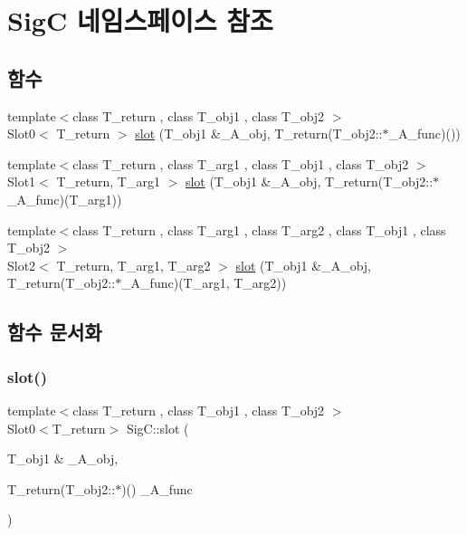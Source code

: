 \hypertarget{namespace_sig_c}{}\section{SigC 네임스페이스 참조}
\label{namespace_sig_c}
\subsection*{함수}
\begin{DoxyCompactItemize}
\item 
{\footnotesize template$<$class T\+\_\+return , class T\+\_\+obj1 , class T\+\_\+obj2 $>$ }\\Slot0$<$ T\+\_\+return $>$ \mbox{\hyperlink{namespace_sig_c_a92e4f19202b77e78ac1db05f5a62f6b6}{slot}} (T\+\_\+obj1 \&\+\_\+\+A\+\_\+obj, T\+\_\+return(T\+\_\+obj2\+::$\ast$\+\_\+\+A\+\_\+func)())
\item 
{\footnotesize template$<$class T\+\_\+return , class T\+\_\+arg1 , class T\+\_\+obj1 , class T\+\_\+obj2 $>$ }\\Slot1$<$ T\+\_\+return, T\+\_\+arg1 $>$ \mbox{\hyperlink{namespace_sig_c_a593d0d3f9fec3996bcdb781f14bff628}{slot}} (T\+\_\+obj1 \&\+\_\+\+A\+\_\+obj, T\+\_\+return(T\+\_\+obj2\+::$\ast$\+\_\+\+A\+\_\+func)(T\+\_\+arg1))
\item 
{\footnotesize template$<$class T\+\_\+return , class T\+\_\+arg1 , class T\+\_\+arg2 , class T\+\_\+obj1 , class T\+\_\+obj2 $>$ }\\Slot2$<$ T\+\_\+return, T\+\_\+arg1, T\+\_\+arg2 $>$ \mbox{\hyperlink{namespace_sig_c_a894ae71a244ee5c71e891342ab536db1}{slot}} (T\+\_\+obj1 \&\+\_\+\+A\+\_\+obj, T\+\_\+return(T\+\_\+obj2\+::$\ast$\+\_\+\+A\+\_\+func)(T\+\_\+arg1, T\+\_\+arg2))
\end{DoxyCompactItemize}


\subsection{함수 문서화}
\mbox{\label{namespace_sig_c_a92e4f19202b77e78ac1db05f5a62f6b6}} 
\subsubsection{\texorpdfstring{slot()}{slot()}\hspace{0.1cm}{\footnotesize\ttfamily [1/3]}}
{\footnotesize\ttfamily template$<$class T\+\_\+return , class T\+\_\+obj1 , class T\+\_\+obj2 $>$ \\
Slot0$<$T\+\_\+return$>$ Sig\+C\+::slot (\begin{DoxyParamCaption}\item[{T\+\_\+obj1 \&}]{\+\_\+\+A\+\_\+obj,  }\item[{T\+\_\+return(T\+\_\+obj2\+::$\ast$)()}]{\+\_\+\+A\+\_\+func }\end{DoxyParamCaption})\hspace{0.3cm}{\ttfamily [inline]}}



